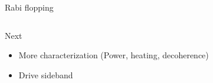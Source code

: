 \documentclass{beamer}
\begin{document}
\begin{frame}{Rabi flopping}
  \begin{columns}
    \column{6cm}
    \column{6cm}
  \end{columns}
  \visible<+-> {
    \begin{center}
      \begin{block}{Next}
        \begin{itemize}[<+->]
        \item More characterization (Power, heating, decoherence)
        \item Drive sideband
        \end{itemize}
      \end{block}
    \end{center}
  }
\end{frame}

\begin{frame}{}
\end{frame}

\begin{frame}{}
\end{frame}
\end{document}
